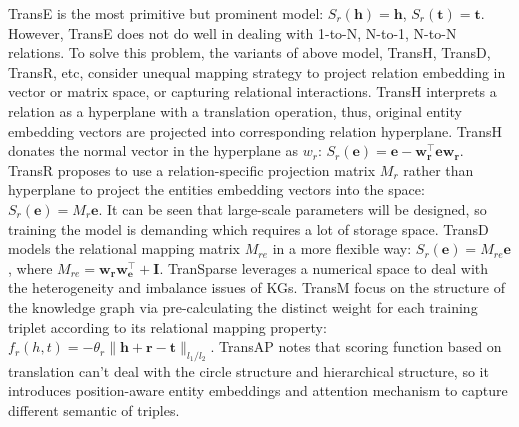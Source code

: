 \documentclass[letterpaper]{article} \usepackage{aaai20}  \usepackage{times}  \usepackage{helvet} \usepackage{courier}  \usepackage[hyphens]{url}  \usepackage{graphicx} \usepackage{lineno,hyperref,amsmath,amssymb}
\begin{document}
TransE\cite{abboud2020boxe} is the most primitive but prominent model: $S_r (\boldsymbol{h})=\boldsymbol{h}$, $S_r (\boldsymbol{t})=\boldsymbol{t}$. However, TransE does not do well in dealing with 1-to-N, N-to-1, N-to-N relations. To solve this problem, the variants of above model, TransH, TransD, TransR, etc, consider unequal mapping strategy to project relation embedding in vector or matrix space, or capturing relational interactions\cite{ji2020survey}. TransH\cite{wang2014knowledge} interprets a relation as a hyperplane with a translation operation, thus, original entity embedding vectors are projected into corresponding relation hyperplane. TransH donates the normal vector in the hyperplane as $w_r$:  $S_r (\boldsymbol{e})=\boldsymbol{e}-\boldsymbol{w}_{\boldsymbol{r}}^{\top } \boldsymbol{e} \boldsymbol{w}_{\boldsymbol{r}}$. TransR\cite{lin2015learning} proposes to use a relation-specific projection matrix $M_r$ rather than hyperplane to project the entities embedding vectors into the space: $S_r (\boldsymbol{e})=M_r \boldsymbol{e} $. It can be seen that large-scale parameters will be designed, so training the model is demanding which requires a lot of storage space. TransD\cite{ji2015knowledge} models the relational mapping matrix $M_{re}$ in a more flexible way: $S_r (\boldsymbol{e})=M_{re} \boldsymbol{e}$, where $M_{re}=\boldsymbol{w}_{\boldsymbol{r}} \boldsymbol{w} _{\boldsymbol{e}}^ {\top} + \boldsymbol{I}$. TranSparse\cite{ji2016knowledge} leverages a numerical space to deal with the heterogeneity and imbalance issues of KGs. TransM\cite{fan2014transition} focus on the structure of the knowledge graph via pre-calculating the distinct weight for each training triplet according to its relational mapping property: $f_r (h,t)= -\theta_{r}\|\boldsymbol{h}+\boldsymbol{r}-\boldsymbol{t}\|_{l_1 / l_2}$. TransAP\cite{zhang2020improve} notes that scoring function based on translation can’t deal with the circle structure and hierarchical structure, so it introduces position-aware entity embeddings and attention mechanism to capture different semantic of triples.
\end{document}
